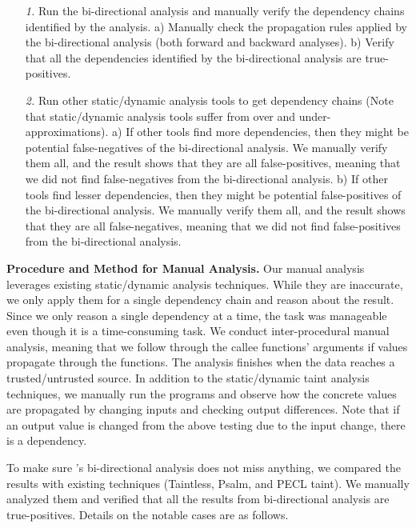 \begin{itemize}[leftmargin=*]
    \item [\it 1.] Run the bi-directional analysis and manually verify the dependency chains identified by the analysis. a) Manually check the propagation rules applied by the bi-directional analysis (both forward and backward analyses). b) Verify that all the dependencies identified by the bi-directional analysis are true-positives.
    
    \item [\it 2.] Run other static/dynamic analysis tools to get dependency chains (Note that static/dynamic analysis tools suffer from over and under-approximations). a) If other tools find more dependencies, then they might be potential false-negatives of the bi-directional analysis. We manually verify them all, and the result shows that they are all false-positives, meaning that we did not find false-negatives from the bi-directional analysis. b) If other tools find lesser dependencies, then they might be potential false-positives of the bi-directional analysis. We manually verify them all, and the result shows that they are all false-negatives, meaning that we did not find false-positives from the bi-directional analysis.
\end{itemize}


\noindent
{\bf Procedure and Method for Manual Analysis.}
Our manual analysis leverages existing static/dynamic analysis techniques. While they are inaccurate, we only apply them for a single dependency chain and reason about the result. Since we only reason a single dependency at a time, the task was manageable even though it is a time-consuming task. 
We conduct inter-procedural manual analysis, meaning that we follow through the callee functions' arguments if values propagate through the functions.
The analysis finishes when the data reaches a trusted/untrusted source.
In addition to the static/dynamic taint analysis techniques, we manually run the programs and observe how the concrete values are propagated by changing inputs and checking output differences. Note that if an output value is changed from the above testing due to the input change, there is a dependency.



To make sure \sysname's bi-directional analysis does not miss anything, we compared the results with existing techniques (Taintless, Psalm, and PECL taint). We manually analyzed them and verified that all the results from bi-directional analysis are true-positives. 
Details on the notable cases are as follows.

